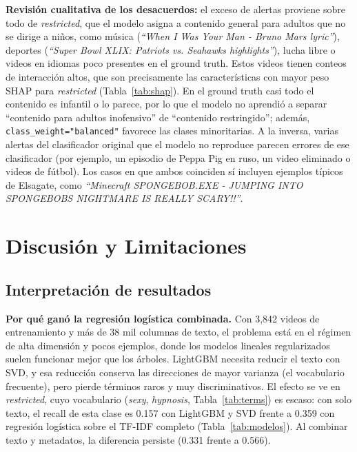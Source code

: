 \documentclass[conference]{IEEEtran}
\begin{document}
\textbf{Revisión cualitativa de los desacuerdos:} el exceso de alertas proviene sobre todo de \textit{restricted}, que el modelo asigna a contenido general para adultos que no se dirige a niños, como música (\emph{``When I Was Your Man - Bruno Mars lyric''}), deportes (\emph{``Super Bowl XLIX: Patriots vs. Seahawks highlights''}), lucha libre o videos en idiomas poco presentes en el ground truth. Estos videos tienen conteos de interacción altos, que son precisamente las características con mayor peso SHAP para \textit{restricted} (Tabla~\ref{tab:shap}). En el ground truth casi todo el contenido es infantil o lo parece, por lo que el modelo no aprendió a separar ``contenido para adultos inofensivo'' de ``contenido restringido''; además, \texttt{class\_weight="balanced"} favorece las clases minoritarias. A la inversa, varias alertas del clasificador original que el modelo no reproduce parecen errores de ese clasificador (por ejemplo, un episodio de Peppa Pig en ruso, un video eliminado o videos de fútbol). Los casos en que ambos coinciden sí incluyen ejemplos típicos de Elsagate, como \emph{``Minecraft SPONGEBOB.EXE - JUMPING INTO SPONGEBOBS NIGHTMARE IS REALLY SCARY!!''}.
\section{Discusión y Limitaciones}\label{sec:discusion}

\subsection{Interpretación de resultados}\label{sec:interp}
\textbf{Por qué ganó la regresión logística combinada.} Con 3,842 videos de entrenamiento y más de 38 mil columnas de texto, el problema está en el régimen de alta dimensión y pocos ejemplos, donde los modelos lineales regularizados suelen funcionar mejor que los árboles. LightGBM necesita reducir el texto con SVD, y esa reducción conserva las direcciones de mayor varianza (el vocabulario frecuente), pero pierde términos raros y muy discriminativos. El efecto se ve en \textit{restricted}, cuyo vocabulario (\textit{sexy}, \textit{hypnosis}, Tabla~\ref{tab:terms}) es escaso: con solo texto, el recall de esta clase es 0.157 con LightGBM y SVD frente a 0.359 con regresión logística sobre el TF-IDF completo (Tabla~\ref{tab:modelos}). Al combinar texto y metadatos, la diferencia persiste (0.331 frente a 0.566).
\end{document}
